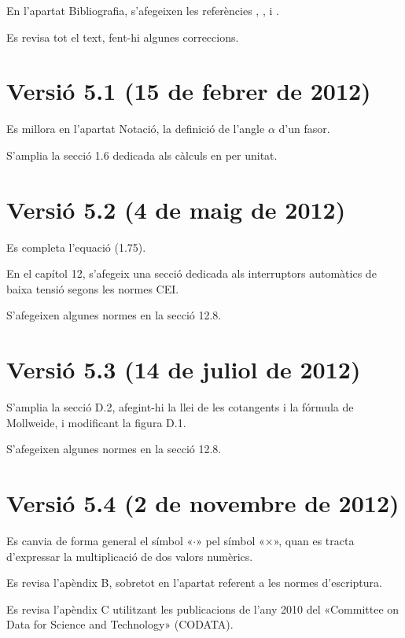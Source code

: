 En l'apartat Bibliografia, s'afegeixen les referències \cite{GRZ}, \cite{DUN}, \cite{REI} i \cite{TLE}.

Es revisa tot el text, fent-hi algunes correccions.

\section*{Versió 5.1 (15 de febrer de 2012)}

Es millora en l'apartat Notació, la definició de l'angle $\alpha$ d'un fasor.

S'amplia la secció 1.6 dedicada als càlculs en per unitat.


\section*{Versió 5.2 (4 de maig de 2012)}

Es completa l'equació (1.75).

En el capítol 12, s'afegeix una secció dedicada als interruptors automàtics de baixa tensió segons les normes CEI.

S'afegeixen algunes normes en la secció 12.8.

\section*{Versió 5.3 (14 de juliol de 2012)}

S'amplia la secció D.2, afegint-hi la llei de les cotangents i la fórmula de Mollweide, i modificant  la figura D.1.

S'afegeixen algunes normes en la secció 12.8.

\section*{Versió 5.4 (2 de novembre de 2012)}

Es canvia de forma general el símbol «$\cdot$» pel símbol «$\times$», quan es tracta d'expressar la multiplicació de dos valors numèrics.

Es revisa l'apèndix B, sobretot en l'apartat referent a les normes d'escriptura.

Es revisa l'apèndix C utilitzant les publicacions de l'any 2010 del «Committee on Data for Science and Technology» (CODATA).

